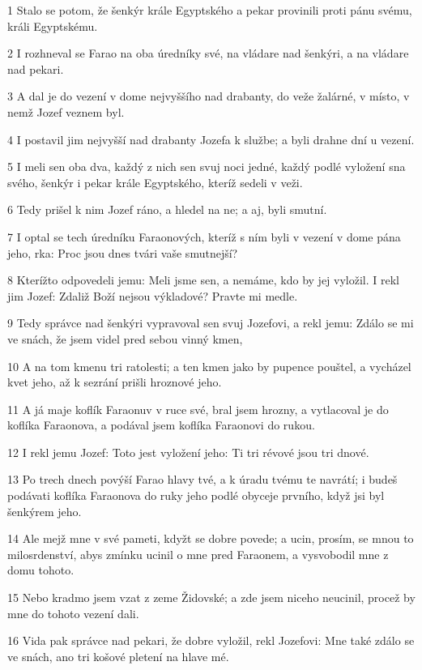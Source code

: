 \par 1 Stalo se potom, že šenkýr krále Egyptského a pekar provinili proti pánu svému, králi Egyptskému.
\par 2 I rozhneval se Farao na oba úredníky své, na vládare nad šenkýri, a na vládare nad pekari.
\par 3 A dal je do vezení v dome nejvyššího nad drabanty, do veže žalárné, v místo, v nemž Jozef veznem byl.
\par 4 I postavil jim nejvyšší nad drabanty Jozefa k službe; a byli drahne dní u vezení.
\par 5 I meli sen oba dva, každý z nich sen svuj noci jedné, každý podlé vyložení sna svého, šenkýr i pekar krále Egyptského, kteríž sedeli v veži.
\par 6 Tedy prišel k nim Jozef ráno, a hledel na ne; a aj, byli smutní.
\par 7 I optal se tech úredníku Faraonových, kteríž s ním byli v vezení v dome pána jeho, rka: Proc jsou dnes tvári vaše smutnejší?
\par 8 Kterížto odpovedeli jemu: Meli jsme sen, a nemáme, kdo by jej vyložil. I rekl jim Jozef: Zdaliž Boží nejsou výkladové? Pravte mi medle.
\par 9 Tedy správce nad šenkýri vypravoval sen svuj Jozefovi, a rekl jemu: Zdálo se mi ve snách, že jsem videl pred sebou vinný kmen,
\par 10 A na tom kmenu tri ratolesti; a ten kmen jako by pupence pouštel, a vycházel kvet jeho, až k sezrání prišli hroznové jeho.
\par 11 A já maje koflík Faraonuv v ruce své, bral jsem hrozny, a vytlacoval je do koflíka Faraonova, a podával jsem koflíka Faraonovi do rukou.
\par 12 I rekl jemu Jozef: Toto jest vyložení jeho: Ti tri révové jsou tri dnové.
\par 13 Po trech dnech povýší Farao hlavy tvé, a k úradu tvému te navrátí; i budeš podávati koflíka Faraonova do ruky jeho podlé obyceje prvního, když jsi byl šenkýrem jeho.
\par 14 Ale mejž mne v své pameti, kdyžt se dobre povede; a ucin, prosím, se mnou to milosrdenství, abys zmínku ucinil o mne pred Faraonem, a vysvobodil mne z domu tohoto.
\par 15 Nebo kradmo jsem vzat z zeme Židovské; a zde jsem niceho neucinil, procež by mne do tohoto vezení dali.
\par 16 Vida pak správce nad pekari, že dobre vyložil, rekl Jozefovi: Mne také zdálo se ve snách, ano tri košové pletení na hlave mé.
